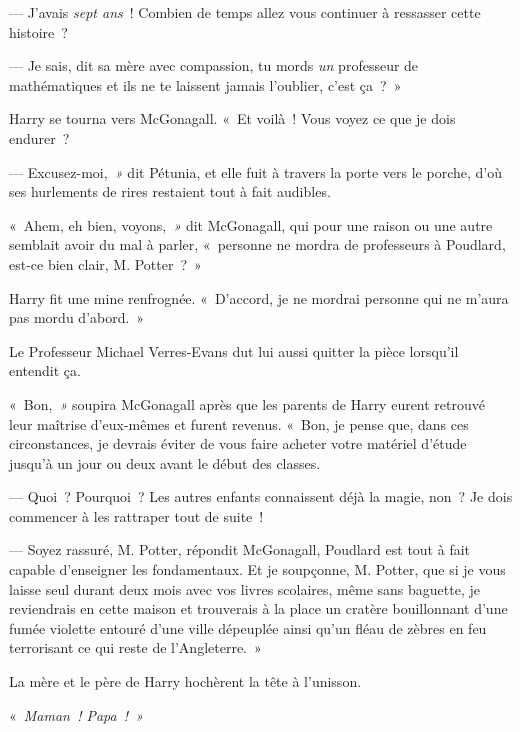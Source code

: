 --- J'avais \emph{sept ans}~! Combien de temps allez vous continuer à ressasser cette histoire~?

--- Je sais, dit sa mère avec compassion, tu mords \emph{un} professeur de mathématiques et ils ne te laissent jamais l'oublier, c'est ça~?~»

Harry se tourna vers McGonagall. «~Et voilà~! Vous voyez ce que je dois endurer~?

--- Excusez-moi,\emph{~»} dit Pétunia, et elle fuit à travers la porte vers le porche, d'où ses hurlements de rires restaient tout à fait audibles.

«~Ahem, eh bien, voyons,\emph{~»} dit McGonagall, qui pour une raison ou une autre semblait avoir du mal à parler, «~personne ne mordra de professeurs à Poudlard, est-ce bien clair, M. Potter~?~»

Harry fit une mine renfrognée. «~D'accord, je ne mordrai personne qui ne m'aura pas mordu d'abord.~»

Le Professeur Michael Verres-Evans dut lui aussi quitter la pièce lorsqu'il entendit ça.

«~Bon,\emph{~»} soupira McGonagall après que les parents de Harry eurent retrouvé leur maîtrise d'eux-mêmes et furent revenus. «~Bon, je pense que, dans ces circonstances, je devrais éviter de vous faire acheter votre matériel d'étude jusqu'à un jour ou deux avant le début des classes.

--- Quoi~? Pourquoi~? Les autres enfants connaissent déjà la magie, non~? Je dois commencer à les rattraper tout de suite~!

--- Soyez rassuré, M. Potter, répondit McGonagall, Poudlard est tout à fait capable d'enseigner les fondamentaux. Et je soupçonne, M. Potter, que si je vous laisse seul durant deux mois avec vos livres scolaires, même sans baguette, je reviendrais en cette maison et trouverais à la place un cratère bouillonnant d'une fumée violette entouré d'une ville dépeuplée ainsi qu'un fléau de zèbres en feu terrorisant ce qui reste de l'Angleterre.~»

La mère et le père de Harry hochèrent la tête à l'unisson.

«~\emph{Maman~! Papa~!~»}
